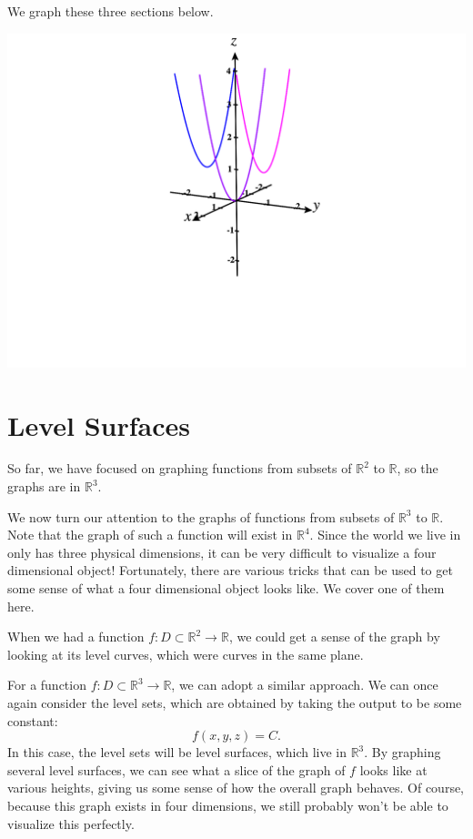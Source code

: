 \documentclass{ximera}
\begin{document}
\begin{example}
We graph these three sections below.

\begin{image}
\includegraphics[width = \textwidth]{CalcPlot3D-y_sections}
\end{image}

\end{example}

\section*{Level Surfaces}

So far, we have focused on graphing functions from subsets of $\mathbb{R}^2$ to $\mathbb{R}$, so the graphs are in $\mathbb{R}^3$.

We now turn our attention to the graphs of functions from subsets of $\mathbb{R}^3$ to $\mathbb{R}$. Note that the graph of such a function will exist in $\mathbb{R}^4$. Since the world we live in only has three physical dimensions, it can be very difficult to visualize a four dimensional object! Fortunately, there are various tricks that can be used to get some sense of what a four dimensional object looks like. We cover one of them here.

When we had a function $f:D\subset\mathbb{R}^2\rightarrow\mathbb{R}$, we could get a sense of the graph by looking at its level curves, which were curves in the same plane.

For a function $f:D\subset\mathbb{R}^3\rightarrow\mathbb{R}$, we can adopt a similar approach. We can once again consider the level sets, which are obtained by taking the output to be some constant:
\[
f(x,y,z) = C.
\]
In this case, the level sets will be level surfaces, which live in $\mathbb{R}^3$. By graphing several level surfaces, we can see what a slice of the graph of $f$ looks like at various heights, giving us some sense of how the overall graph behaves. Of course, because this graph exists in four dimensions, we still probably won't be able to visualize this perfectly.
\end{document}
